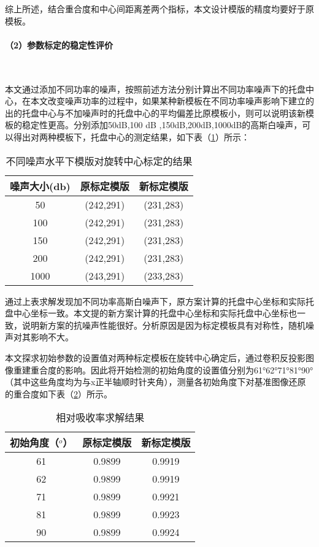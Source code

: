 \documentclass[withoutpreface,bwprint]{cumcmthesis} %
\begin{document}
综上所述，结合重合度和中心间距离差两个指标，本文设计模版的精度均要好于原模板。

\paragraph*{（2）参数标定的稳定性评价}~\\
\par 本文通过添加不同功率的噪声，按照前述方法分别计算出不同功率噪声下的托盘中心，在本文改变噪声功率的过程中，如果某种新模板在不同功率噪声影响下建立的出的托盘中心与不加噪声时的托盘中心的平均偏差比原模板小，则可以说明该新模板的稳定性更高。分别添加50dB,100 dB ,150dB,200dB,1000dB的高斯白噪声，可以得出对两种模板下，托盘中心的测定结果，如下表（\ref{不同噪声水平下模版对旋转中心标定的结果}）所示：

\begin{table}[!h]
\centering
\caption{不同噪声水平下模版对旋转中心标定的结果}
\label{不同噪声水平下模版对旋转中心标定的结果}
\begin{tabular}{ccc}
\toprule
噪声大小(db)&原标定模版&新标定模版\\
\midrule
50   & (242,291) & (231,283) \\
100  & (242,291) & (231,283) \\
150  & (242,291) & (231,283) \\
200  & (242,291) & (231,283) \\
1000 & (243,291) & (233,283) \\
\bottomrule 
\end{tabular}
\end{table}

\par 通过上表求解发现加不同功率高斯白噪声下，原方案计算的托盘中心坐标和实际托盘中心坐标一致。本文提的新方案计算的托盘中心坐标和实际托盘中心坐标也一致，说明新方案的抗噪声性能很好。分析原因是因为标定模板具有对称性，随机噪声对其影响不大。

\par 本文探求初始参数的设置值对两种标定模板在旋转中心确定后，通过卷积反投影图像重建重合度的影响。因此将开始检测的初始角度的设置值分别为61°62°71°81°90°（其中这些角度均为与x正半轴顺时针夹角），测量各初始角度下对基准图像还原的重合度如下表（\ref{相对吸收率求解结果}）所示。

\begin{table}[!h]
\centering
\caption{相对吸收率求解结果}
\label{相对吸收率求解结果}
\begin{tabular}{ccc}
\toprule
初始角度（$^o$）&原标定模版&新标定模版\\
\midrule
61 & 0.9899 &0.9919\\
62 &0.9899 &0.9919\\
71 &0.9899 &0.9921\\
81 &0.9899 &0.9923\\
90 &0.9899 &0.9924\\
\bottomrule 
\end{tabular}
\end{table}
\end{document}
